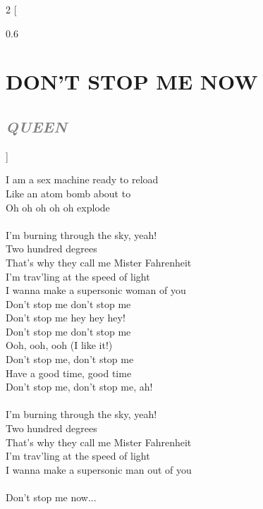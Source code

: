 \documentclass[100pt,a4paper]{report}
\newenvironment{song2}[2]
	{	
    	\begin{multicols*}{2}
		[
			\begin{spacing}{0.6}
				\section*{\LARGE\centering \MakeUppercase{\textbf{{#1}}}}
				\subsection*{\Large\centering \textit{\textcolor{gray}{\MakeUppercase{{#2}}}}}
			\end{spacing}
		]
		\Large
	}
	{
	\end{multicols*}
	\newpage
    }
\begin{document}
\begin{song2}{Don't stop me now}{Queen}
I am a sex machine ready to reload\\
Like an atom bomb about to\\
Oh oh oh oh oh explode\\
\\
I'm burning through the sky, yeah!\\
Two hundred degrees\\
That's why they call me Mister Fahrenheit\\
I'm trav'ling at the speed of light\\
I wanna make a supersonic woman of you\\
Don't stop me don't stop me\\
Don't stop me hey hey hey!\\
Don't stop me don't stop me\\ 
Ooh, ooh, ooh (I like it!)\\
Don't stop me, don't stop me\\
Have a good time, good time\\
Don't stop me, don't stop me, ah!\\
\\
I'm burning through the sky, yeah!\\
Two hundred degrees\\
That's why they call me Mister Fahrenheit\\
I'm trav'ling at the speed of light\\
I wanna make a supersonic man out of you\\
\\
Don't stop me now...
\end{song2}
\end{document}
